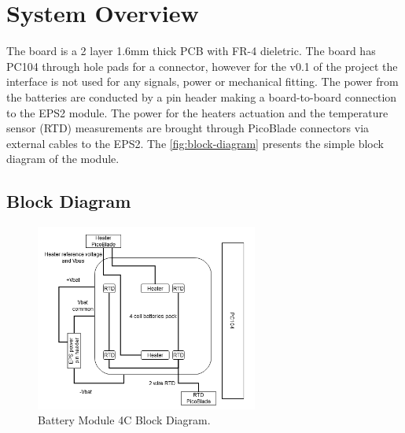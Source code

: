 %
%
%
%
%

%
%
%
%
%
%

\chapter{System Overview} \label{ch:system-overview}

The board is a 2 layer 1.6mm thick PCB with FR-4 dieletric. The board has PC104 through hole pads for a connector, however for the v0.1 of the project the interface is not used for any signals, power or mechanical fitting.
The power from the batteries are conducted by a pin header making a board-to-board connection to the EPS2 module. The power for the heaters actuation and the temperature sensor (RTD) measurements are brought through PicoBlade connectors via external cables to the EPS2.
The \autoref{fig:block-diagram} presents the simple block diagram of the module.

\section{Block Diagram}

\begin{figure}[!ht]
    \begin{center}
        \includegraphics[width=0.65\textwidth]{figures/bat4c_block_diagram}
        \caption{Battery Module 4C Block Diagram.}
        \label{fig:block-diagram}
    \end{center}
\end{figure}